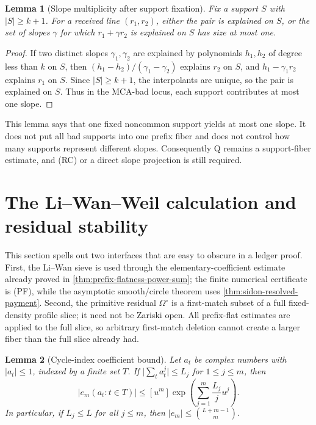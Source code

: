 \documentclass[12pt,a4paper]{amsart}
\numberwithin{equation}{section}
\newtheorem{lemma}[lemma]{Lemma}
\theoremstyle{remark}
\newcommand{\Omc}{\Omega^{\circ}}
\newcommand{\abs}[1]{\lvert #1\rvert}
\begin{document}
\begin{lemma}[Slope multiplicity after support fixation]\label{lem:slope-multiplicity-fixed-support}
Fix a support \(S\) with \(\abs S\ge k+1\).  For a received line \((r_1,r_2)\), either the pair is explained on \(S\), or the set of slopes \(\gamma\) for which \(r_1+\gamma r_2\) is explained on \(S\) has size at most one.
\end{lemma}

\begin{proof}
If two distinct slopes \(\gamma_1,\gamma_2\) are explained by polynomials \(h_1,h_2\) of degree less than \(k\) on \(S\), then \((h_1-h_2)/(\gamma_1-\gamma_2)\) explains \(r_2\) on \(S\), and \(h_1-\gamma_1 r_2\) explains \(r_1\) on \(S\).  Since \(\abs S\ge k+1\), the interpolants are unique, so the pair is explained on \(S\).  Thus in the MCA-bad locus, each support contributes at most one slope.
\end{proof}

This lemma says that one fixed noncommon support yields at most one slope.
It does not put all bad supports into one prefix fiber and does not control
how many supports represent different slopes.  Consequently Q remains a
support-fiber estimate, and \textup{(RC)} or a direct slope projection is
still required.

\section{The Li--Wan--Weil calculation and residual stability}\label{sec:li-wan-details}

This section spells out two interfaces that are easy to obscure in a
ledger proof.  First, the Li--Wan sieve is used through the
elementary-coefficient estimate already proved in
\cref{thm:prefix-flatness-power-sum}; the finite numerical certificate is
\textup{(PF)}, while the asymptotic smooth/circle theorem uses
\cref{thm:sidon-resolved-payment}.  Second, the primitive residual
\(\Omc\) is a first-match subset of a full fixed-density profile slice; it
need not be Zariski open.  All prefix-flat estimates are applied to the
full slice, so arbitrary first-match deletion cannot create a larger fiber
than the full slice already had.

\begin{lemma}[Cycle-index coefficient bound]\label{lem:cycle-index-bound}
Let \(a_t\) be complex numbers with \(\abs{a_t}\le1\), indexed by a finite set \(T\).  If \(\abs{\sum_t a_t^j}\le L_j\) for \(1\le j\le m\), then
\[
        \abs{e_m(a_t:t\in T)}
        \le [u^m]\exp\left(\sum_{j=1}^m\frac{L_j}{j}u^j\right).
\]
In particular, if \(L_j\le L\) for all \(j\le m\), then \(\abs{e_m}\le\binom{L+m-1}{m}\).
\end{lemma}
\end{document}
